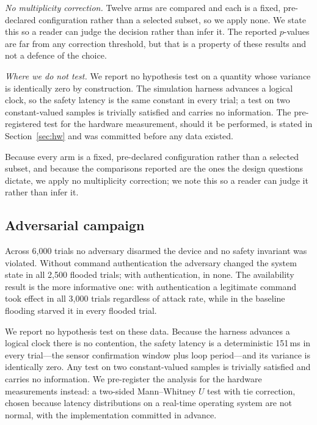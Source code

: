 \emph{No multiplicity correction.} Twelve arms are compared and each is a fixed, pre-declared
configuration rather than a selected subset, so we apply none. We state this so a reader can judge
the decision rather than infer it. The reported $p$-values are far from any correction threshold,
but that is a property of these results and not a defence of the choice.

\emph{Where we do not test.} We report no hypothesis test on a quantity whose variance is
identically zero by construction. The simulation harness advances a logical clock, so the safety
latency is the same constant in every trial; a test on two constant-valued samples is trivially
satisfied and carries no information. The pre-registered test for the hardware measurement,
should it be performed, is stated in Section~\ref{sec:hw} and was committed before any data
existed.

Because every arm is a fixed, pre-declared configuration rather than a selected subset, and
because the comparisons reported are the ones the design questions dictate, we apply no
multiplicity correction; we note this so a reader can judge it rather than infer it.

\subsection{Adversarial campaign}

Across 6{,}000 trials no adversary disarmed the device and no safety invariant was violated.
Without command authentication the adversary changed the system state in all 2{,}500 flooded
trials; with authentication, in none. The availability result is the more informative one: with
authentication a legitimate command took effect in all 3{,}000 trials regardless of attack rate,
while in the baseline flooding starved it in every flooded trial.

We report no hypothesis test on these data. Because the harness advances a logical clock there
is no contention, the safety latency is a deterministic 151\,ms in every trial---the sensor
confirmation window plus loop period---and its variance is identically zero. Any test on two
constant-valued samples is trivially satisfied and carries no information. We pre-register the
analysis for the hardware measurements instead: a two-sided Mann--Whitney $U$ test with tie
correction, chosen because latency distributions on a real-time operating system are not normal,
with the implementation committed in advance.

